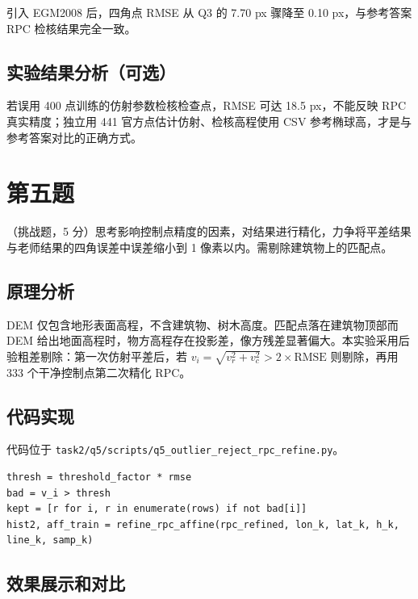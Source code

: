 \documentclass[UTF8,zihao=-4,a4paper]{ctexart}
\begin{document}
引入 EGM2008 后，四角点 RMSE 从 Q3 的 7.70 px 骤降至 0.10 px，与参考答案 RPC 检核结果完全一致。

\subsection{实验结果分析（可选）}

若误用 400 点训练的仿射参数检核检查点，RMSE 可达 18.5 px，不能反映 RPC 真实精度；独立用 441 官方点估计仿射、检核高程使用 CSV 参考椭球高，才是与参考答案对比的正确方式。

\section{第五题}

（挑战题，5 分）思考影响控制点精度的因素，对结果进行精化，力争将平差结果与老师结果的四角误差中误差缩小到 1 像素以内。需剔除建筑物上的匹配点。

\subsection{原理分析}

DEM 仅包含地形表面高程，不含建筑物、树木高度。匹配点落在建筑物顶部而 DEM 给出地面高程时，物方高程存在投影差，像方残差显著偏大。本实验采用后验粗差剔除：第一次仿射平差后，若 $v_i=\sqrt{v_r^2+v_c^2}>2\times\mathrm{RMSE}$ 则剔除，再用 333 个干净控制点第二次精化 RPC。

\subsection{代码实现}

代码位于 \texttt{task2/q5/scripts/q5\_outlier\_reject\_rpc\_refine.py}。

\begin{lstlisting}[style=pythonstyle,caption={后验粗差剔除 + 第二次 RPC 精化}]
thresh = threshold_factor * rmse
bad = v_i > thresh
kept = [r for i, r in enumerate(rows) if not bad[i]]
hist2, aff_train = refine_rpc_affine(rpc_refined, lon_k, lat_k, h_k, line_k, samp_k)
\end{lstlisting}

\subsection{效果展示和对比}
\end{document}
